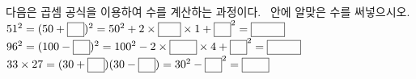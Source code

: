 다음은 곱셈 공식을 이용하여 수를 계산하는 과정이다. \blank\ 안에 알맞은 수를 써넣으시오.
 $51^2=(50+\blank)^2=50^2+2\times\blank[2em]\times1+\blank^2=\blank[3em]$
 $96^2=(100-\blank)^2=100^2-2\times\blank[2.4em]\times4+\blank^2=\blank[3em]$
 $33\times27=(30+\blank)(30-\blank)=30^2-\blank^2=\blank[2.4em]$
